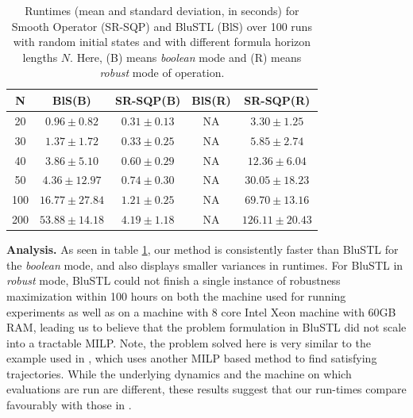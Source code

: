 \begin{exmp}
\begin{table}[tb]
\small
\begin{center}
\caption{{\small Runtimes (mean and standard deviation, in seconds) for Smooth Operator (SR-SQP) and BluSTL (BlS) over 100 runs with random initial states and with different formula horizon lengths $N$. Here, (B) means \textit{boolean} mode and (R) means \textit{robust} mode of operation.}}
\vspace{-5pt}
\label{tbl:time_performance_toy}
\begin{tabular} {|c|c|c|c|c|}
	\hline
	N & BlS(B) & SR-SQP(B) & BlS(R) & SR-SQP(R) \\ \hline
	20 & $0.96 \pm 0.82$ &  $\mathbf{0.31 \pm 0.13}$  & NA & $3.30 \pm 1.25$ \\ \hline
	30 & $1.37 \pm 1.72$ &  $\mathbf{0.33 \pm 0.25}$  & NA & $5.85 \pm 2.74$\\ \hline
	40 & $3.86 \pm 5.10$ &  $\mathbf{0.60 \pm 0.29}$  & NA & $12.36 \pm 6.04$\\ \hline
	50 & $4.36 \pm 12.97$&  $\mathbf{0.74 \pm 0.30}$ & NA & $30.05 \pm 18.23$\\ \hline
	100& $16.77 \pm 27.84$ & $\mathbf{1.21 \pm 0.25}$ & NA & $69.70 \pm 13.16$ \\ \hline
	200& $53.88 \pm 14.18$& $\mathbf{4.19 \pm 1.18}$ & NA & $126.11 \pm 20.43$ \\ \hline
\end{tabular}	
\end{center}
\end{table}

\textbf{Analysis.}
As seen in table \ref{tbl:time_performance_toy}, our method is consistently faster than BluSTL for the \textit{boolean} mode, and also displays smaller variances in runtimes. For BluSTL in \textit{robust} mode, BluSTL could not finish a single instance of robustness maximization within 100 hours on both the machine used for running experiments as well as on a machine with 8 core Intel Xeon machine with 60GB RAM, leading us to believe that the problem formulation in BluSTL did not scale into a tractable MILP. Note, the problem solved here is very similar to the example used in \cite{Saha_acc16}, which uses another MILP based method to find satisfying trajectories. While the underlying dynamics and the machine on which evaluations are run are different, these results suggest that our run-times compare favourably with those in \cite{Saha_acc16}.


\end{exmp}
